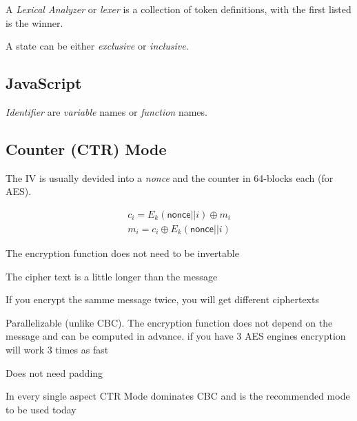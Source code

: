 \documentclass[12pt]{article}
\begin{document}
A \emph{Lexical Analyzer} or \emph{lexer} is a collection of token definitions, with the first listed is the winner.



A state can be either \emph{exclusive} or \emph{inclusive}.



\subsection{JavaScript}

\emph{Identifier} are \emph{variable} names or \emph{function} names.





\subsection*{Counter (CTR) Mode}

The IV is usually devided into a \emph{nonce} and the counter in 64-blocks each (for AES).

\begin{equation}
\begin{split}
c_i = E_k(\textsf{nonce}||i) \oplus m_i \\
m_i = c_i \oplus E_k(\textsf{nonce}||i)
\end{split}
\end{equation}

\begin{list}{*}{
\setlength{\itemsep}{0pt}
\setlength{\parsep}{0pt}
\setlength{\topsep}{0pt}
\setlength{\partopsep}{0pt}
\setlength{\leftmargin}{2em}
\setlength{\labelwidth}{1.5em}
\setlength{\labelsep}{0.5em}
}
\item The encryption function does not need to be invertable
\item The cipher text is a little longer than the message
\item If you encrypt the samme message twice, you will get different ciphertexts
\item Parallelizable (unlike CBC). The encryption function does not depend on the message and can be computed in advance. if you have 3 AES engines encryption will work 3 times as fast
\item Does not need padding
\item In every single aspect CTR Mode dominates CBC and is the recommended mode to be used today
\end{list}
\end{document}
